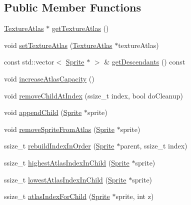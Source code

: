 \subsection*{Public Member Functions}
\begin{DoxyCompactItemize}
\item 
\hyperlink{classTextureAtlas}{Texture\+Atlas} $\ast$ \hyperlink{classSpriteBatchNode_ad6a2949d1af5b70038158ae0a6c84fff}{get\+Texture\+Atlas} ()
\item 
void \hyperlink{classSpriteBatchNode_a53497de819859ff84079d77e11cbd512}{set\+Texture\+Atlas} (\hyperlink{classTextureAtlas}{Texture\+Atlas} $\ast$texture\+Atlas)
\item 
const std\+::vector$<$ \hyperlink{classSprite}{Sprite} $\ast$ $>$ \& \hyperlink{classSpriteBatchNode_adcf146809bbf5d09e2228cf1cff65e06}{get\+Descendants} () const
\item 
void \hyperlink{classSpriteBatchNode_ad76d544ea06e10d6413ab978c868bc70}{increase\+Atlas\+Capacity} ()
\item 
void \hyperlink{classSpriteBatchNode_a3da2c77141f4f02134d2a8f2308879ff}{remove\+Child\+At\+Index} (ssize\+\_\+t index, bool do\+Cleanup)
\item 
void \hyperlink{classSpriteBatchNode_a8da90ef24ba5d4c27b063a302498c436}{append\+Child} (\hyperlink{classSprite}{Sprite} $\ast$sprite)
\item 
void \hyperlink{classSpriteBatchNode_a3e6e600aa1cf10812ae36b2930e56e9d}{remove\+Sprite\+From\+Atlas} (\hyperlink{classSprite}{Sprite} $\ast$sprite)
\item 
ssize\+\_\+t \hyperlink{classSpriteBatchNode_a7de1df383d81f839fb932ad571273766}{rebuild\+Index\+In\+Order} (\hyperlink{classSprite}{Sprite} $\ast$parent, ssize\+\_\+t index)
\item 
ssize\+\_\+t \hyperlink{classSpriteBatchNode_a35d235f36390aea4f98b05f9f883cc76}{highest\+Atlas\+Index\+In\+Child} (\hyperlink{classSprite}{Sprite} $\ast$sprite)
\item 
ssize\+\_\+t \hyperlink{classSpriteBatchNode_aae2f59d34b31c69b731f13296129cf94}{lowest\+Atlas\+Index\+In\+Child} (\hyperlink{classSprite}{Sprite} $\ast$sprite)
\item 
ssize\+\_\+t \hyperlink{classSpriteBatchNode_a86c50a80880095b311ba60fa04c4152f}{atlas\+Index\+For\+Child} (\hyperlink{classSprite}{Sprite} $\ast$sprite, int z)
\item 
\mbox{\label{classSpriteBatchNode_a46297ebf702382d09be8ab76b776613b}} 

\end{DoxyCompactItemize}
